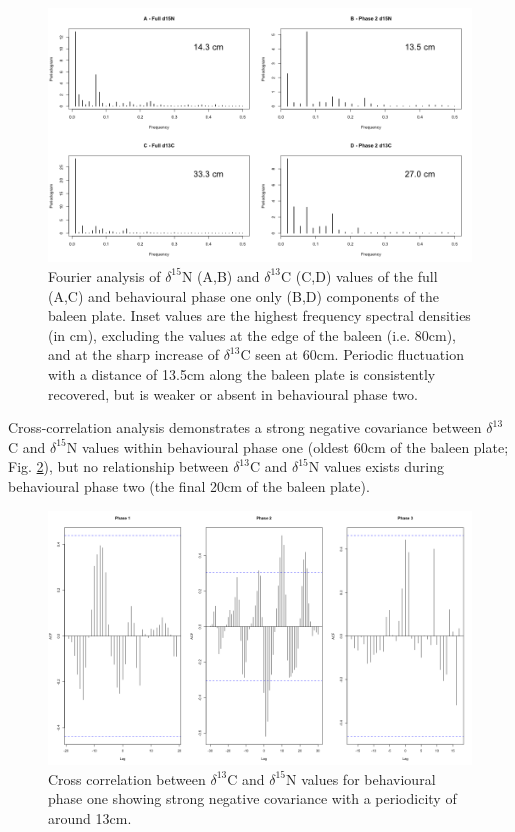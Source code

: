 \documentclass[a4paper,12pt]{article}
\begin{document}
\begin{figure}[!htbp]
  \centering
  \includegraphics[width = \linewidth]{figures/Figure-S1-periodograms.png}
  \caption{Fourier analysis of $\delta^{15}$N (A,B) and $\delta^{13}$C (C,D) values of the full (A,C) and behavioural phase one only (B,D) components of the baleen plate. Inset values are the highest frequency spectral densities (in cm), excluding the values at the edge of the baleen (i.e. 80cm), and at the sharp increase of $\delta^{13}$C seen at 60cm. Periodic fluctuation with a distance of 13.5cm along the baleen plate is consistently recovered, but is weaker or absent in behavioural phase two.} 
  \label{figs1}
\end{figure}
 
Cross-correlation analysis demonstrates a strong negative covariance between $\delta^{13}$C and $\delta^{15}$N values within behavioural phase one (oldest 60cm of the baleen plate; Fig. \ref{figs2}), but no relationship between $\delta^{13}$C and $\delta^{15}$N values exists during behavioural phase two (the final 20cm of the baleen plate). 

\begin{figure}[!htbp]
  \centering
  \includegraphics[width = \linewidth]{figures/Figure-S2-cross-cor.png}
  \caption{Cross correlation between $\delta^{13}$C and $\delta^{15}$N values for behavioural phase one showing strong negative covariance with a periodicity of around 13cm.} %
  \label{figs2}
\end{figure}
 
\end{document}
